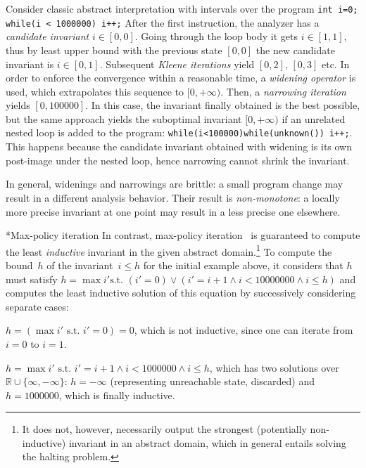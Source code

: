 \documentclass{llncs}
\makeatletter
\newcommand{\union}{\cup}
\newcommand{\Real}{\ensuremath{\mathbb{R}}}
\renewcommand{\paragraph}{\@startsection{paragraph}{4}{\z@}{0.8ex \@plus 0ex \@minus 1ex}{-1em}{\normalfont\normalsize\bfseries}}
\makeatother
\begin{document}
Consider classic abstract interpretation with intervals over the program
\texttt{int i=0; while(i < 1000000) i++;}
After the first instruction, the analyzer has a \emph{candidate invariant} $i \in [0,0]$. Going through the
loop body it gets $i \in [1,1]$, thus by least upper bound with the previous
state $[0,0]$ the new candidate invariant is $i \in [0,1]$.
Subsequent \emph{Kleene iterations} yield $[0,2]$, $[0,3]$ etc.
In order to enforce the convergence within a reasonable time, a \emph{widening operator} is used, which extrapolates this sequence to $[0,+\infty)$.
Then, a \emph{narrowing iteration} yields $[0,100000]$.
In this case, the invariant finally obtained is the best possible, but the same
approach yields the suboptimal invariant $[0,+\infty)$ if an unrelated nested loop
is added to the program: \texttt{while(i<100000){while(unknown()){} i++;}}.
This happens because the candidate invariant obtained with widening is its own post-image
under the nested loop, hence narrowing cannot shrink the invariant.

In general, widenings and narrowings are brittle: a
small program change may result in a different
analysis behavior. Their result is \emph{non-monotone}:
a locally more precise invariant at one point may result in a less precise one elsewhere.

\paragraph*{Max-policy iteration} In contrast, max-policy
iteration~\cite{max_strategy_templates} is
guaranteed to compute the least \emph{inductive} invariant in the given abstract
domain.\footnote{It does not, however, necessarily output the strongest (potentially
non-inductive) invariant in an abstract domain, which in general entails solving
the halting problem.}
To compute the bound~$h$ of the invariant~$i \leq h$ for the initial example above,
it considers that $h$ must satisfy $h = \max i' \mbox{
    s.t. } (i'=0) \lor (i'=i + 1 \land i < 10000000 \land i \leq h)$
and computes the least inductive solution of this equation by successively considering separate cases:
\begin{compactenum}[(i)]
\item $h = (\max i' \mbox{ s.t. } i'=0) = 0$, which is not inductive, since one can iterate from $i=0$ to $i=1$.
\item $h = \max i' \mbox{ s.t. } i'=i+1 \land i < 1000000 \land i \leq h$,
    which has two
    solutions over $\Real \union \{\infty, -\infty\}$: $h = -\infty$
    (representing unreachable state, discarded)
    and $h = 1000000$, which is finally inductive.
\end{compactenum}
\end{document}
